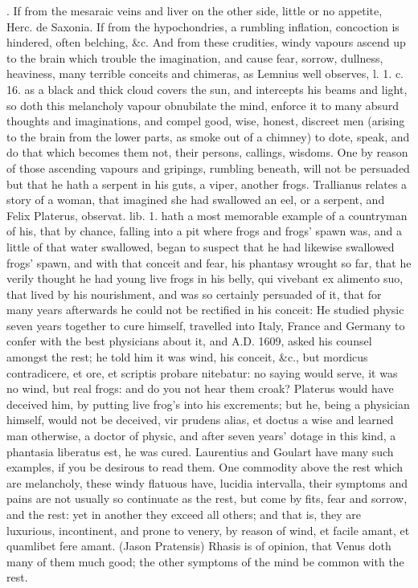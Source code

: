 {\Avicenna{}. If from the mesaraic veins and liver on the other side,
little or no appetite, Herc. de Saxonia. If from the hypochondries, a
rumbling inflation, concoction is hindered, often belching, \&c. And
from these crudities, windy vapours ascend up to the brain which
trouble the imagination, and cause fear, sorrow, dullness, heaviness,
many terrible conceits and chimeras, as Lemnius well observes, l. 1. c.
16. as a black and thick cloud covers the sun, and intercepts his
beams and light, so doth this melancholy vapour obnubilate the mind,
enforce it to many absurd thoughts and imaginations, and compel good,
wise, honest, discreet men (arising to the brain from the  lower
parts, as smoke out of a chimney) to dote, speak, and do that which
becomes them not, their persons, callings, wisdoms. One by reason of
those ascending vapours and gripings, rumbling beneath, will not be
persuaded but that he hath a serpent in his guts, a viper, another
frogs. Trallianus relates a story of a woman, that imagined she had
swallowed an eel, or a serpent, and Felix Platerus, observat. lib. 1.
hath a most memorable example of a countryman of his, that by chance,
falling into a pit where frogs and frogs' spawn was, and a little of
that water swallowed, began to suspect that he had likewise swallowed
frogs' spawn, and with that conceit and fear, his phantasy wrought so
far, that he verily thought he had young live frogs in his belly, qui
vivebant ex alimento suo, that lived by his nourishment, and was so
certainly persuaded of it, that for many years afterwards he could not
be rectified in his conceit: He studied physic seven years together to
cure himself, travelled into Italy, France and Germany to confer with
the best physicians about it, and A.D. 1609, asked his counsel amongst
the rest; he told him it was wind, his conceit, \&c., but mordicus
contradicere, et ore, et scriptis probare nitebatur: no saying would
serve, it was no wind, but real frogs: and do you not hear them croak?
Platerus would have deceived him, by putting live frog's into his
excrements; but he, being a physician himself, would not be deceived,
vir prudens alias, et doctus a wise and learned man otherwise, a doctor
of physic, and after seven years' dotage in this kind, a phantasia
liberatus est, he was cured. Laurentius and Goulart have many such
examples, if you be desirous to read them. One commodity above the rest
which are melancholy, these windy flatuous have, lucidia intervalla,
their symptoms and pains are not usually so continuate as the rest, but
come by fits, fear and sorrow, and the rest: yet in another they exceed
all others; and that is, they are luxurious, incontinent, and
prone to venery, by reason of wind, et facile amant, et quamlibet fere
amant. (Jason Pratensis) Rhasis is of opinion, that Venus doth
many of them much good; the other symptoms of the mind be common with
the rest.

}
